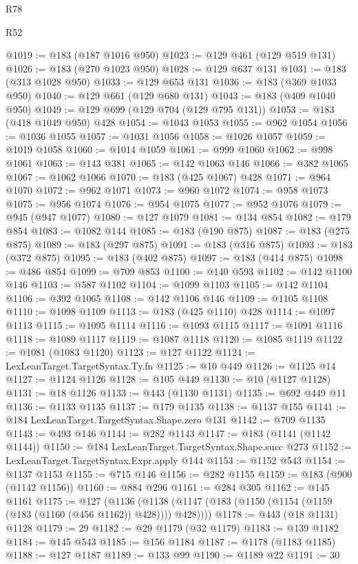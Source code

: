 \begin{lexlean}{R78}
\begin{lexlean}{R52}
\begin{coremodule}
{{{{{{{{{{{{{{{{{{{{{{{{{{{{{{{{{{{{{{{{{{{{{{{{{{{{{{{{{{{{{{{{{{{{{{{{{{{{{{{{{{{{{{{{{{{{{{{{{{{{{{{{{{{{{{{{{{{{{{{{{{{{{{{{{{{{{{{{{{{{{{{{{{{{{{{{{{{{{{{{{{{{{{{{{{{{{{{{{{{{{{{{{{{{{{{{{{{{{{@1019 := @183 (@187 @1016 @950)
@1023 := @129 @461 (@129 @519 @131)
@1026 := @183 (@270 @1023 @950)
@1028 := @129 @637 @131
@1031 := @183 (@313 @1028 @950)
@1033 := @129 @653 @131
@1036 := @183 (@369 @1033 @950)
@1040 := @129 @661 (@129 @680 @131)
@1043 := @183 (@409 @1040 @950)
@1049 := @129 @699 (@129 @704 (@129 @795 @131))
@1053 := @183 (@418 @1049 @950) @428
@1054 := @1043 @1053
@1055 := @962 @1054
@1056 := @1036 @1055
@1057 := @1031 @1056
@1058 := @1026 @1057
@1059 := @1019 @1058
@1060 := @1014 @1059
@1061 := @999 @1060
@1062 := @998 @1061
@1063 := @143 @381
@1065 := @142 @1063 @146
@1066 := @382 @1065
@1067 := @1062 @1066
@1070 := @183 (@425 @1067) @428
@1071 := @964 @1070
@1072 := @962 @1071
@1073 := @960 @1072
@1074 := @958 @1073
@1075 := @956 @1074
@1076 := @954 @1075
@1077 := @952 @1076
@1079 := @945 (@947 @1077)
@1080 := @127 @1079
@1081 := @134 @854
@1082 := @179 @854
@1083 := @1082 @144
@1085 := @183 (@190 @875)
@1087 := @183 (@275 @875)
@1089 := @183 (@297 @875)
@1091 := @183 (@316 @875)
@1093 := @183 (@372 @875)
@1095 := @183 (@402 @875)
@1097 := @183 (@414 @875)
@1098 := @486 @854
@1099 := @709 @853
@1100 := @140 @593
@1102 := @142 @1100 @146
@1103 := @587 @1102
@1104 := @1099 @1103
@1105 := @142 @1104
@1106 := @392 @1065
@1108 := @142 @1106 @146
@1109 := @1105 @1108
@1110 := @1098 @1109
@1113 := @183 (@425 @1110) @428
@1114 := @1097 @1113
@1115 := @1095 @1114
@1116 := @1093 @1115
@1117 := @1091 @1116
@1118 := @1089 @1117
@1119 := @1087 @1118
@1120 := @1085 @1119
@1122 := @1081 (@1083 @1120)
@1123 := @127 @1122
@1124 := LexLeanTarget.TargetSyntax.Ty.fn
@1125 := @10 @449
@1126 := @1125 @14
@1127 := @1124 @1126
@1128 := @105 @449
@1130 := @10 (@1127 @1128)
@1131 := @18 @1126
@1133 := @443 (@1130 @1131)
@1135 := @692 @449 @11
@1136 := @1133 @1135
@1137 := @179 @1135
@1138 := @1137 @155
@1141 := @184 LexLeanTarget.TargetSyntax.Shape.zero @131
@1142 := @709 @1135
@1143 := @493 @146
@1144 := @282 @1143
@1147 := @183 (@1141 (@1142 @1144))
@1150 := @184 LexLeanTarget.TargetSyntax.Shape.succ @273
@1152 := LexLeanTarget.TargetSyntax.Expr.apply @144
@1153 := @1152 @543
@1154 := @1137 @1153
@1155 := @715 @146
@1156 := @282 @1155
@1159 := @183 (@900 (@1142 @1156))
@1160 := @884 @296
@1161 := @284 @305
@1162 := @145 @1161
@1175 := @127
    (@1136 (@1138 (@1147 (@183 (@1150 (@1154 (@1159 (@183 (@1160 (@456 @1162)) @428)))) @428))))
@1178 := @443 (@18 @1131) @1128
@1179 := 29
@1182 := @29 @1179 (@32 @1179)
@1183 := @139 @1182
@1184 := @145 @543
@1185 := @156 @1184
@1187 := @1178 (@1183 @1185)
@1188 := @127 @1187
@1189 := @133 @99
@1190 := @1189 @22
@1191 := 30
}}}}}}}}}}}}}}}}}}}}}}}}}}}}}}}}}}}}}}}}}}}}}}}}}}}}}}}}}}}}}}}}}}}}}}}}}}}}}}}}}}}}}}}}}}}}}}}}}}}}}}}}}}}}}}}}}}}}}}}}}}}}}}}}}}}}}}}}}}}}}}}}}}}}}}}}}}}}}}}}}}}}}}}}}}}}}}}}}}}}}}}}}}}}}}}}}}}}}}
\end{coremodule}
\end{lexlean}
\end{lexlean}
